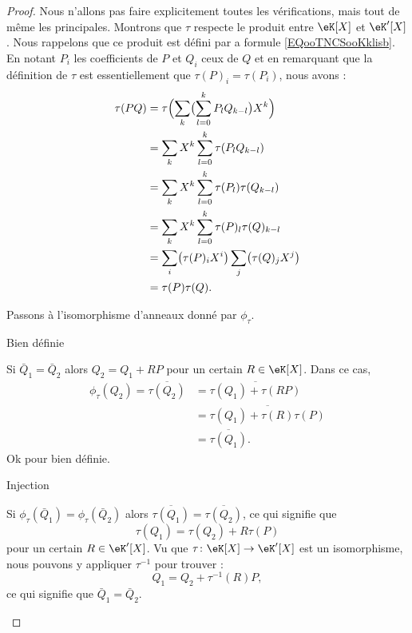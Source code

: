 \begin{proof}
    Nous n'allons pas faire explicitement toutes les vérifications, mais tout de même les principales. Montrons que \( \tau\) respecte le produit entre \( \eK[X]\) et \( \eK'[X]\). Nous rappelons que ce produit est défini par a formule \eqref{EQooTNCSooKklisb}. En notant \( P_i\) les coefficients de \( P\) et \( Q_i\) ceux de \( Q\) et en remarquant que la définition de \( \tau\) est essentiellement que \( \tau(P)_i=\tau(P_i)\), nous avons :
    \begin{subequations}
        \begin{align}
            \tau(PQ)&=\tau\Bigl( \sum_k\bigl(\sum_{l=0}^kP_lQ_{k-l}\bigr)X^k \Bigr)\\
            &=\sum_k X^k \sum_{l=0}^k\tau(P_lQ_{k-l})\\
            &=\sum_k X^k \sum_{l=0}^k\tau(P_l)\tau(Q_{k-l})\\
            &=\sum_k X^k \sum_{l=0}^k\tau(P)_l\tau(Q)_{k-l}\\
            &=\sum_{i} \bigl(\tau(P)_iX^i\bigr)\sum_j\bigl(\tau(Q)_j X^j\bigr)\\
            &=\tau(P)\tau(Q).
        \end{align}
    \end{subequations}

    Passons à l'isomorphisme d'anneaux donné par \( \phi_{\tau}\).
    \begin{subproof}
        \item[Bien définie]

            Si \( \bar Q_1=\bar Q_2\) alors \( Q_2=Q_1+RP\) pour un certain \( R\in \eK[X]\). Dans ce cas,
            \begin{subequations}
                \begin{align}
                    \phi_{\tau}(Q_2)=\overline{ \tau(Q_2) }&=\overline{ \tau(Q_1)+\tau(RP) }\\
                    &=\overline{ \tau(Q_1)+\tau(R)\tau(P) }\\
                    &=\overline{ \tau(Q_1) }.
                \end{align}
            \end{subequations}
            Ok  pour bien définie.

        \item[Injection]

            Si \( \phi_{\tau}(\bar Q_1)=\phi_{\tau}(\bar Q_2)\) alors \( \overline{ \tau(Q_1) }=\overline{ \tau(Q_2) }\), ce qui signifie que
            \begin{equation}
                \tau(Q_1)=\tau(Q_2)+R\tau(P)
            \end{equation}
            pour un certain \( R\in \eK'[X]\). Vu que \( \tau\colon \eK[X]\to \eK'[X]\) est un isomorphisme, nous pouvons y appliquer \( \tau^{-1}\) pour trouver :
            \begin{equation}
                Q_1=Q_2+\tau^{-1}(R)P,
            \end{equation}
            ce qui signifie que \( \bar Q_1=\bar Q_2\).


\end{subproof}
\end{proof}
